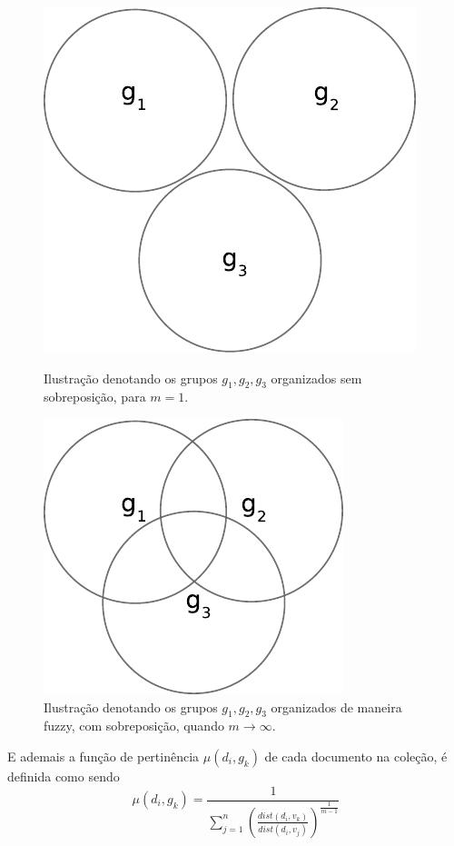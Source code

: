 \begin{figure}[!htp] \centering 
  \begin{minipage}{0.45\textwidth} 
    \centering
    \includegraphics[width=0.6\columnwidth]{assets/clusters_crisp.pdf} 
    \caption{Ilustração denotando os
grupos $g_1,g_2,g_3$ organizados sem sobreposição, para $m = 1$.} \label{fig:cluster_crisp}
  \end{minipage}\hfill 
  \begin{minipage}{0.45\textwidth} \centering
    \includegraphics[width=0.6\columnwidth]{assets/clusters_fuzzy.pdf} 
    \caption{Ilustração denotando os
    grupos $g_1,g_2,g_3$ organizados de maneira fuzzy, com sobreposição, quando 
    $m \rightarrow \infty$.}
    \label{fig:cluster_fuzzy} 
  \end{minipage} 
\end{figure} 
E ademais a função de pertinência
$\mu(d_i,g_k)$ de cada documento na coleção, é definida como sendo 
\begin{equation} 
  \mu(d_i,g_k) = \frac{1}{\sum_{j=1}^n(\frac{dist(d_i,v_k)}{dist(d_i,v_j)})^{\frac{1}{m-1}}} 
  \label{eq:pertinencia}
\end{equation}
